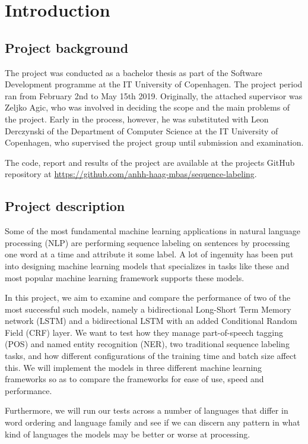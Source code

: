 
\section{Introduction}

\subsection{Project background}


The project was conducted as a bachelor thesis as part of the Software
Development programme at the IT University of Copenhagen. The project period ran
from February 2nd to May 15th 2019. Originally, the attached supervisor was
Zeljko Agic, who was involved in deciding the scope and the main problems of the
project. Early in the process, however, he was substituted with Leon Derczynski
of the Department of Computer Science at the IT University of Copenhagen, who
supervised the project group until submission and examination.

The code, report and results of the project are available at the projects GitHub
repository at \url{https://github.com/anhh-haag-mbas/sequence-labeling}.


\subsection{Project description}

Some of the most fundamental machine learning applications in natural language
processing (NLP) are performing sequence labeling on sentences by processing
one word at a time and attribute it some label. A lot of ingenuity has been put
into designing machine learning models that specializes in tasks like these and
most popular machine learning framework supports these models.

In this project, we aim to examine and compare the performance of two of the
most successful such models, namely a bidirectional Long-Short Term Memory
network (LSTM) and a bidirectional LSTM with an added Conditional Random Field
(CRF) layer. We want to test how they manage part-of-speech tagging (POS) and
named entity recognition (NER), two traditional sequence labeling tasks, and
how different configurations of the training time and batch size affect this. We
will implement the models in three different machine learning frameworks so as
to compare the frameworks for ease of use, speed and performance.

Furthermore, we will run our tests across a number of languages that differ in
word ordering and language family and see if we can discern any pattern in what
kind of languages the models may be better or worse at processing.


